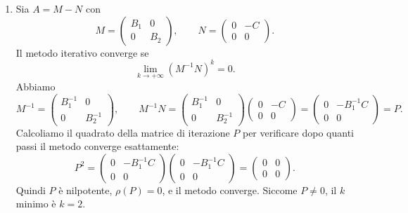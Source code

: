 \documentclass[a4paper]{article}
\begin{document}
\begin{snippetsolution}{}
\begin{enumerate}
        \item Sia \(A=M-N\) con
            \[
                M =
                \begin{pmatrix}
                    B_1 & 0 \\
                    0 & B_2
                \end{pmatrix},
                \qquad
                N =
                \begin{pmatrix}
                    0 & -C \\
                    0 & 0
                \end{pmatrix}.
            \]
            Il metodo iterativo converge se
            \[
                \lim_{k \to +\infty} {(M^{-1} N)}^k = 0.
            \]
            Abbiamo
            \[
                M^{-1} =
                \begin{pmatrix}
                    B_1^{-1} & 0 \\
                    0 & B_2^{-1}
                \end{pmatrix},
                \qquad
                M^{-1}N =
                \begin{pmatrix}
                    B_1^{-1} & 0 \\
                    0 & B_2^{-1}
                \end{pmatrix}
                \begin{pmatrix}
                    0 & -C \\
                    0 & 0
                \end{pmatrix}
                =
                \begin{pmatrix}
                    0 & -B_1^{-1}C \\
                    0 & 0
                \end{pmatrix}
                = P.
            \]
            Calcoliamo il quadrato della matrice di iterazione \(P\) per verificare
            dopo quanti passi il metodo converge esattamente:
            \[
                P^2 =
                \begin{pmatrix}
                    0 & -B_1^{-1}C \\
                    0 & 0
                \end{pmatrix}
                \begin{pmatrix}
                    0 & -B_1^{-1}C \\
                    0 & 0
                \end{pmatrix}
                =
                \begin{pmatrix}
                    0 & 0 \\
                    0 & 0
                \end{pmatrix}.
            \]
            Quindi \(P\) è nilpotente, \(\rho(P)=0\), e il metodo converge.
            Siccome \(P \neq 0\), il \(k\) minimo è \(k=2\).
    \end{enumerate}
\end{snippetsolution}
\end{document}
